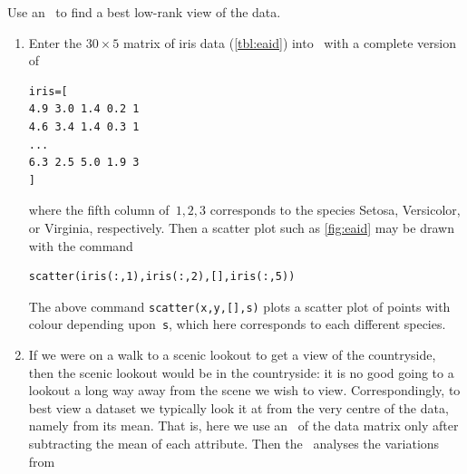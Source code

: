 \begin{example}
\begin{solution} 
Use an \svd\ to find a best low-rank view of the data.
\begin{enumerate}
\item Enter the \(30\times5\) matrix of iris data (\cref{tbl:eaid}) into \script\  with a complete version of
\begin{verbatim}
iris=[
4.9 3.0 1.4 0.2 1
4.6 3.4 1.4 0.3 1
...
6.3 2.5 5.0 1.9 3
]
\end{verbatim}
where the fifth column of~\(1,2,3\) corresponds to the species Setosa, Versicolor, or Virginia, respectively.
\setbox\ajrqrbox\hbox{}%
\marginajrbox%
Then a scatter plot such as \cref{fig:eaid} may be drawn with the command
\begin{verbatim}
scatter(iris(:,1),iris(:,2),[],iris(:,5))
\end{verbatim}
The above command \verb|scatter(x,y,[],s)|  plots a scatter plot of points with colour depending upon~\verb|s|, which here corresponds to each different species.

\item If we were on a walk to a scenic lookout to get a view of the countryside, then the scenic lookout would be in the countryside: it is no good going to a lookout a long way away from the scene we wish to view.
Correspondingly, to best view a dataset we typically look it at from the very centre of the data, namely from its mean.
That is, here we use an \svd\ of the data matrix only after subtracting the mean of each attribute.
Then the \svd\ analyses the variations from 


\end{enumerate}
\end{solution}
\end{example}
